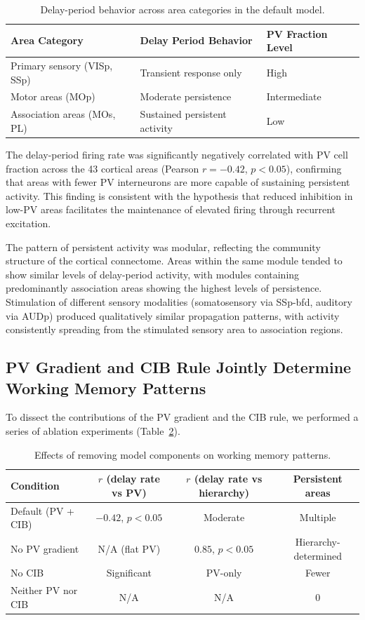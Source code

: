 \documentclass[11pt]{article}
\begin{document}
\begin{table}[h]
\centering
\caption{Delay-period behavior across area categories in the default model.}
\label{tab:delay}
\begin{tabular}{lll}
\toprule
Area Category & Delay Period Behavior & PV Fraction Level \\
\midrule
Primary sensory (VISp, SSp) & Transient response only & High \\
Motor areas (MOp) & Moderate persistence & Intermediate \\
Association areas (MOs, PL) & Sustained persistent activity & Low \\
\bottomrule
\end{tabular}
\end{table}

The delay-period firing rate was significantly negatively correlated with PV cell fraction across the 43 cortical areas (Pearson $r = -0.42$, $p < 0.05$), confirming that areas with fewer PV interneurons are more capable of sustaining persistent activity. This finding is consistent with the hypothesis that reduced inhibition in low-PV areas facilitates the maintenance of elevated firing through recurrent excitation.

The pattern of persistent activity was modular, reflecting the community structure of the cortical connectome. Areas within the same module tended to show similar levels of delay-period activity, with modules containing predominantly association areas showing the highest levels of persistence. Stimulation of different sensory modalities (somatosensory via SSp-bfd, auditory via AUDp) produced qualitatively similar propagation patterns, with activity consistently spreading from the stimulated sensory area to association regions.

\subsection{PV Gradient and CIB Rule Jointly Determine Working Memory Patterns}

To dissect the contributions of the PV gradient and the CIB rule, we performed a series of ablation experiments (Table~\ref{tab:ablation}).

\begin{table}[h]
\centering
\caption{Effects of removing model components on working memory patterns.}
\label{tab:ablation}
\begin{tabular}{lccc}
\toprule
Condition & $r$ (delay rate vs PV) & $r$ (delay rate vs hierarchy) & Persistent areas \\
\midrule
Default (PV + CIB) & $-0.42$, $p < 0.05$ & Moderate & Multiple \\
No PV gradient & N/A (flat PV) & $0.85$, $p < 0.05$ & Hierarchy-determined \\
No CIB & Significant & PV-only & Fewer \\
Neither PV nor CIB & N/A & N/A & 0 \\
\bottomrule
\end{tabular}
\end{table}
\end{document}
